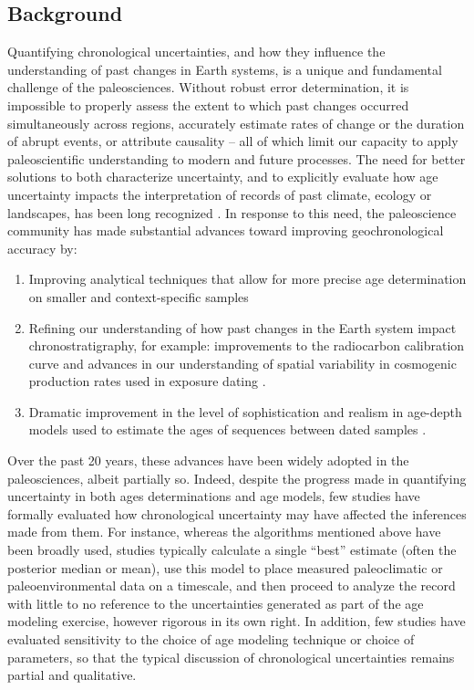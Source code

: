 \documentclass[gchron, manuscript]{copernicus}
\begin{document}
\introduction

\subsection{Background}

Quantifying chronological uncertainties, and how they influence the understanding of past changes in Earth systems, is a unique and fundamental challenge of the paleosciences.
Without robust error determination, it is impossible to properly assess the extent to which past changes occurred simultaneously across regions, accurately estimate rates of change or the duration of abrupt events, or attribute causality -- all of which limit our capacity to apply paleoscientific understanding to modern and future processes.
The need for better solutions to both characterize uncertainty, and to explicitly evaluate how age uncertainty impacts the interpretation of records of past climate, ecology or landscapes, has been long recognized \citep[e.g.,][]{Noren2013, NASEM_CORES_2020}.
In response to this need, the paleoscience community has made substantial advances toward improving geochronological accuracy by:

\begin{enumerate}
\def\labelenumi{\arabic{enumi}.}
\item
  Improving analytical techniques that allow for more precise age determination on smaller and context-specific samples \citep[e.g.,][]{Eggins2005, Santos_blank_2010, zander2020miniature}
\item
  Refining our understanding of how past changes in the Earth system impact chronostratigraphy, for example: improvements to the radiocarbon calibration curve \citep{Reimer09, intcal13, intcal20} and advances in our understanding of spatial variability in cosmogenic production rates used in exposure dating \citep{Balco2009, Masarik2009, charreau2019basinga}.
\item
  Dramatic improvement in the level of sophistication and realism in age-depth models used to estimate the ages of sequences between dated samples \citep[e.g.][]{parnell2008flexible, Ramsey2009Bayesian, Blaauw2010CLAM, Blaauw2011BACON}.
\end{enumerate}

Over the past 20 years, these advances have been widely adopted in the paleosciences, albeit partially so. Indeed, despite the progress made in quantifying uncertainty in both ages determinations and age models, few studies have formally evaluated how chronological uncertainty may have affected the inferences made from them.
For instance, whereas the algorithms mentioned above have been broadly used, studies typically calculate a single ``best'' estimate (often the posterior median or mean), use this model to place measured paleoclimatic or paleoenvironmental data on a timescale, and then proceed to analyze the record with little to no reference to the uncertainties generated as part of the age modeling exercise, however rigorous in its own right.
In addition, few studies have evaluated sensitivity to the choice of age modeling technique or choice of parameters, so that the typical discussion of chronological uncertainties remains partial and qualitative.
\end{document}

